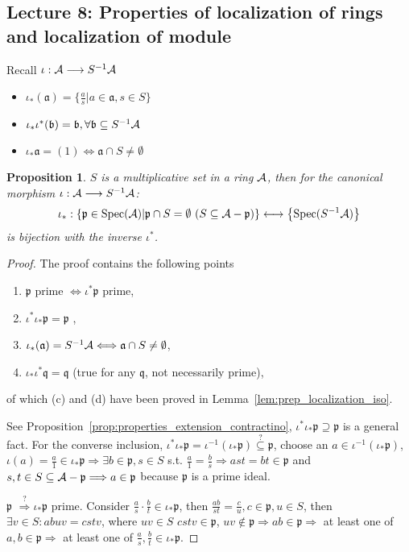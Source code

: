 \documentclass[11pt]{article}
\newtheorem{prop}[thm]{Proposition}
\newcommand{\sca}{{\mathfrak a}}
\newcommand{\scb}{{\mathfrak b}}
\newcommand{\scp}{{\mathfrak p}}
\newcommand{\scq}{\mathfrak q}
\newcommand{\cala}{{\cal A}}
\newcommand{\Lrta}{\Longrightarrow}
\newcommand{\lrta}{\longrightarrow}
\newcommand{\Llrta}{\Longleftrightarrow}
\begin{document}
\subsection{Lecture 8: Properties of localization of rings and localization of module}
Recall
$\iota:\cala\lrta S^{-1}\cala$
\begin{itemize}
\item $\iota_*(\sca)=\{\frac{a}{s}|a\in \sca,s\in S\}$
\item $\iota_*\iota^*(\scb)=\scb,\forall \scb\subseteq S^{-1}\cala$
\item $\iota_*\sca=(1)\Llrta \sca\cap S\neq \emptyset$
\end{itemize}
\begin{prop}\label{prop:iso_spec_localization}
$S$ is a multiplicative set in a ring $\cala$, then for the canonical morphism $\iota:\cala\lrta S^{-1}\cala$:
$$
\iota_*:\left\{\scp\in \text{Spec}(\cala)|\scp\cap S=\emptyset\ (S\subseteq \cala-\scp)\right\}\longleftrightarrow \left\{\text{Spec}(S^{-1}\cala)\right\}
$$
is bijection with the inverse $\iota^*$.
\end{prop}
\begin{proof}
The proof contains the following points
\begin{enumerate}[label=(\alph*)]
\item $\scp$ prime $\Llrta \iota^*\scp$ prime,
\item $\iota^*\iota_*\scp=\scp$ ,
\item $\iota_*(\sca)= S^{-1}\cala\Llrta\sca\cap S\neq \emptyset$,
\item  $\iota_*\iota^*\scq=\scq$ (true for any $\scq$, not necessarily prime),
\end{enumerate}
of which (c) and (d) have  been proved in Lemma~\ref{lem:prep_localization_iso}.

See Proposition~\ref{prop:properties_extension_contractino}, $\iota^*\iota_*\scp\supseteq\scp$ is a general fact.
 For the converse inclusion, $\iota^*\iota_*\scp=\iota^{-1}(\iota_*\scp)\overset{?}{\subseteq}\scp$, choose an $a\in \iota^{-1}(\iota_*\scp)$, $\iota(a)=\frac{a}{1}\in\iota_*\scp\Lrta\exists b\in \scp, s\in S$ s.t. $\frac{a}{1}=\frac{b}{s}\Lrta ast=bt\in \scp$ and $s,t \in S\subseteq \cala-\scp\Lrta a\in \scp$ because $\scp$ is a prime ideal.

 $\scp$  $\overset{?}{\Lrta}\iota_*\scp$ prime. Consider $\frac{a}{s}\cdot \frac{b}{t}\in \iota_*\scp$, then $\frac{ab}{st}=\frac{c}{u},c\in\scp, u\in S$, then $\exists v\in S:abuv=cstv$, where $uv\in S$ $cstv\in\scp$, $uv\not\in \scp\Lrta ab\in\scp\Lrta$ at least one of $a, b\in\scp\Lrta$ at least one of $\frac{a}{s},\frac{b}{t}\in \iota_*\scp$.
\end{proof}
\end{document}
